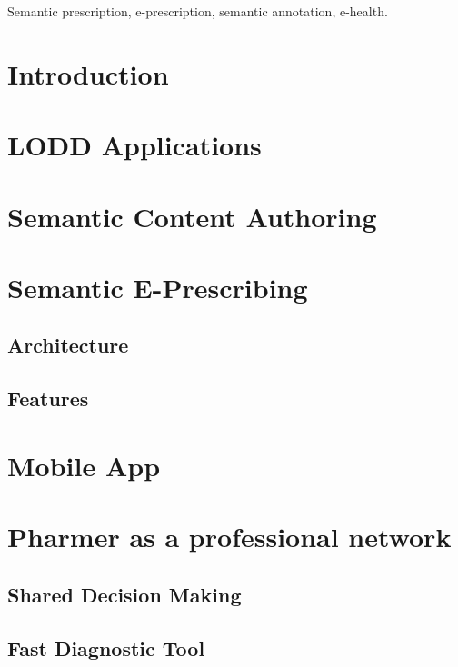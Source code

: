 \documentclass[journal]{IEEEtran}
\begin{document}
\begin{IEEEkeywords}
 Semantic prescription, e-prescription, semantic annotation, e-health.
\end{IEEEkeywords}



\IEEEpeerreviewmaketitle


\section{Introduction}
\label{intro}

\section{LODD Applications}
\label{lod}

\section{Semantic Content Authoring}
\label{sca}


\section{Semantic E-Prescribing}
\label{sep}

\subsection{Architecture}

\subsection{Features}

\section{Mobile App}
\label{mobile}

\section{Pharmer as a professional network}
\label{pharmernet}

\subsection{Shared Decision Making}

\subsection{Fast Diagnostic Tool}
\end{document}
